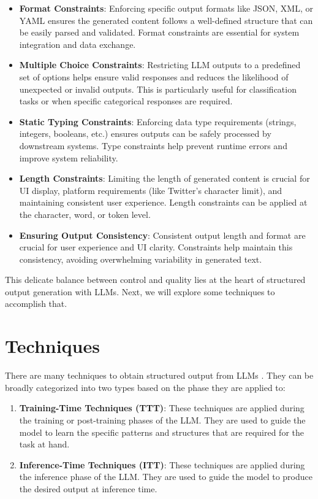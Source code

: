 \begin{itemize}
    \item \textbf{Format Constraints}: Enforcing specific output formats like JSON, XML, or YAML ensures the generated content follows a well-defined structure that can be easily parsed and validated. Format constraints are essential for system integration and data exchange.
    
    \item \textbf{Multiple Choice Constraints}: Restricting LLM outputs to a predefined set of options helps ensure valid responses and reduces the likelihood of unexpected or invalid outputs. This is particularly useful for classification tasks or when specific categorical responses are required.
    
    \item \textbf{Static Typing Constraints}: Enforcing data type requirements (strings, integers, booleans, etc.) ensures outputs can be safely processed by downstream systems. Type constraints help prevent runtime errors and improve system reliability.
    
    \item \textbf{Length Constraints}: Limiting the length of generated content is crucial for UI display, platform requirements (like Twitter's character limit), and maintaining consistent user experience. Length constraints can be applied at the character, word, or token level.
    
    \item \textbf{Ensuring Output Consistency}: Consistent output length and format are crucial for user experience and UI clarity. Constraints help maintain this consistency, avoiding overwhelming variability in generated text.
\end{itemize}

This delicate balance between control and quality lies at the heart of structured output generation with LLMs. Next, we will explore some techniques to accomplish that.
\section{Techniques}

There are many techniques to obtain structured output from LLMs . They can be broadly categorized into two types based on the phase they are applied to:

\begin{enumerate}
    \item \textbf{Training-Time Techniques (TTT)}: These techniques are applied during the training or post-training phases of the LLM. They are used to guide the model to learn the specific patterns and structures that are required for the task at hand.
    \item \textbf{Inference-Time Techniques (ITT)}: These techniques are applied during the inference phase of the LLM. They are used to guide the model to produce the desired output at inference time.
\end{enumerate}

